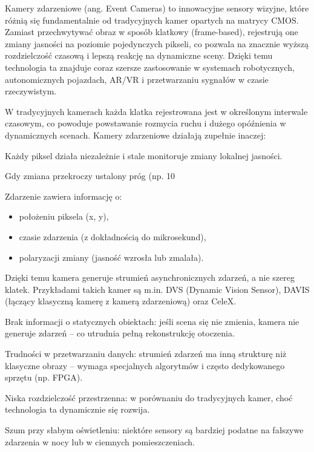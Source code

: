 \documentclass[magisterska]{pracadypl}
\begin{document}
Kamery zdarzeniowe (ang. Event Cameras) to innowacyjne sensory wizyjne, które różnią się fundamentalnie od tradycyjnych kamer opartych na matrycy CMOS. Zamiast przechwytywać obraz w sposób klatkowy (frame-based), rejestrują one zmiany jasności na poziomie pojedynczych pikseli, co pozwala na znacznie wyższą rozdzielczość czasową i lepszą reakcję na dynamiczne sceny. Dzięki temu technologia ta znajduje coraz szersze zastosowanie w systemach robotycznych, autonomicznych pojazdach, AR/VR i przetwarzaniu sygnałów w czasie rzeczywistym.

W tradycyjnych kamerach każda klatka rejestrowana jest w określonym interwale czasowym, co powoduje powstawanie rozmycia ruchu i dużego opóźnienia w dynamicznych scenach. Kamery zdarzeniowe działają zupełnie inaczej:

Każdy piksel działa niezależnie i stale monitoruje zmiany lokalnej jasności.

Gdy zmiana przekroczy ustalony próg (np. 10%

Zdarzenie zawiera informację o:

\begin{itemize}
  \item położeniu piksela (x, y),

  \item czasie zdarzenia (z dokładnością do mikrosekund),

  \item polaryzacji zmiany (jasność wzrosła lub zmalała).
\end{itemize}

Dzięki temu kamera generuje strumień asynchronicznych zdarzeń, a nie szereg klatek. Przykładami takich kamer są m.in. DVS (Dynamic Vision Sensor), DAVIS (łączący klasyczną kamerę z kamerą zdarzeniową) oraz CeleX.

Brak informacji o statycznych obiektach: jeśli scena się nie zmienia, kamera nie generuje zdarzeń – co utrudnia pełną rekonstrukcję otoczenia.

Trudności w przetwarzaniu danych: strumień zdarzeń ma inną strukturę niż klasyczne obrazy – wymaga specjalnych algorytmów i często dedykowanego sprzętu (np. FPGA).

Niska rozdzielczość przestrzenna: w porównaniu do tradycyjnych kamer, choć technologia ta dynamicznie się rozwija.

Szum przy słabym oświetleniu: niektóre sensory są bardziej podatne na fałszywe zdarzenia w nocy lub w ciemnych pomieszczeniach.
\end{document}
